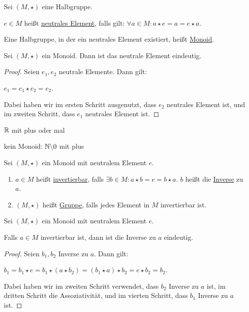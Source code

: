 \begin{definition}
    Sei $(M, \star)$ eine Halbgruppe.

    $e \in M$ heißt \underline{neutrales Element}, falls gilt: $\forall a \in M: a \star e = a = e \star a$.

    Eine Halbgruppe, in der ein neutrales Element existiert, heißt \underline{Monoid}.
\end{definition}

\begin{lemma}
    Sei $(M, \star)$ ein Monoid. Dann ist das neutrale Element eindeutig.
\end{lemma}
\begin{proof}
    Seien $e_1, e_2$ neutrale Elemente. Dann gilt:

    $e_1 = e_1 \star e_2 = e_2$.

    Dabei haben wir im ersten Schritt ausgenutzt, dass $e_2$ neutrales Element ist, und im zweiten Schritt, dass $e_1$ neutrales Element ist.
\end{proof}

\begin{example}
    $\mathbb{R}$ mit plus oder mal

    kein Monoid: $\mathbb{N} \backslash 0$ mit plus
\end{example}

\begin{definition}[Gruppe]
    Sei $(M, \star)$ ein Monoid mit neutralem Element $e$.
    \begin{enumerate}
        \item $a \in M$ heißt \underline{invertierbar}, falls $\exists b \in M: a \star b = e = b \star a$. $b$ heißt die \underline{Inverse} zu $a$.
        \item $(M, \star)$ heißt \underline{Gruppe}, falls jedes Element in $M$ invertierbar ist.
    \end{enumerate}
\end{definition}

\begin{lemma}
    Sei $(M, \star)$ ein Monoid mit neutralem Element $e$.

    Falls $a \in M$ invertierbar ist, dann ist die Inverse zu $a$ eindeutig.
\end{lemma}
\begin{proof}
    Seien $b_1, b_2$ Inverse zu $a$. Dann gilt:

    $b_1 = b_1 \star e = b_1 \star (a \star b_2) = (b_1 \star a) \star b_2 = e \star b_2 = b_2$.

    Dabei haben wir im zweiten Schritt verwendet, dass $b_2$ Inverse zu $a$ ist, im dritten Schritt die Assoziativität, und im vierten Schritt, dass $b_1$ Inverse zu $a$ ist.
\end{proof}

